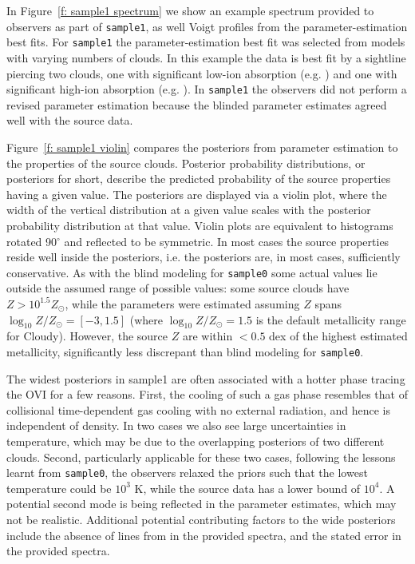 \documentclass[fleqn,usenatbib]{mnras}
\begin{document}
In Figure~\ref{f: sample1 spectrum} we show an example spectrum provided to observers as part of \texttt{sample1},
as well Voigt profiles from the parameter-estimation best fits.
For \texttt{sample1} the parameter-estimation best fit was selected from models with varying numbers of clouds.
In this example the data is best fit by a sightline piercing two clouds, one with significant low-ion absorption (e.g. )  and one with significant high-ion absorption (e.g. ).
In \texttt{sample1} the observers did not perform a revised parameter estimation because the blinded parameter estimates agreed well with the source data.

Figure~\ref{f: sample1 violin} compares the posteriors from parameter estimation to the properties of the source clouds.
Posterior probability distributions, or posteriors for short, describe the predicted probability of the source properties having a given value.
The posteriors are displayed via a violin plot,
where the width of the vertical distribution at a given value scales with the posterior probability distribution at that value.
Violin plots are equivalent to histograms rotated 90$^\circ$ and reflected to be symmetric.
In most cases the source properties reside well inside the posteriors, i.e. the posteriors are, in most cases, sufficiently conservative.
As with the blind modeling for \texttt{sample0} some actual values lie outside the assumed range of possible values: 
some source clouds have $Z > 10^{1.5} Z_\odot$, while the parameters were estimated assuming $Z$ spans $\log_{10} Z/Z_\odot = [-3, 1.5]$ (where $\log_{10} Z/Z_\odot = 1.5$ is the default metallicity range for Cloudy).
However, the source $Z$ are within $< 0.5$ dex of the highest estimated metallicity, significantly less discrepant than blind modeling for \texttt{sample0}.

The widest posteriors in sample1 are often associated with a hotter phase tracing the OVI for a few reasons.
First, the cooling of such a gas phase resembles that of collisional time-dependent gas cooling with no external radiation, and hence is independent of density.
In two cases we also see large uncertainties in temperature, which may be due to the overlapping posteriors of two different clouds.
Second, particularly applicable for these two cases, following the lessons learnt from \texttt{sample0}, the observers relaxed the priors such that the lowest temperature could be $10^3$ K, while the source data has a lower bound of $10^4$.
A potential second mode is being reflected in the parameter estimates, which may not be realistic. 
Additional potential contributing factors to the wide posteriors include the absence of  lines from in the provided spectra, 
and the stated error in the provided spectra.
\end{document}
